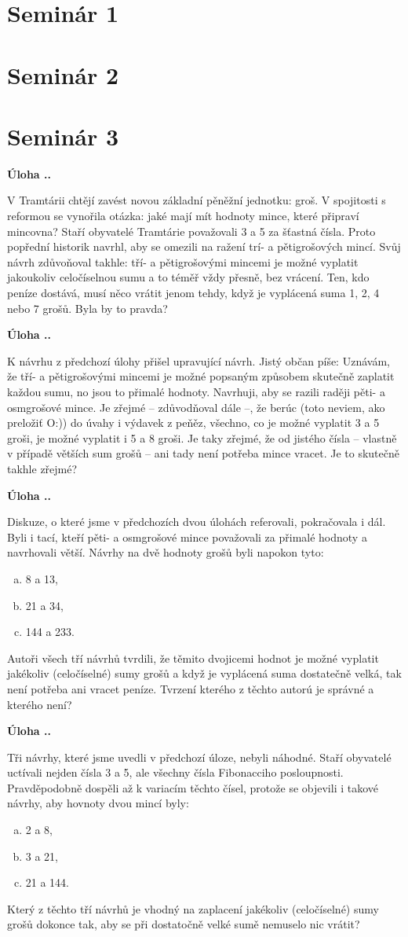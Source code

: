 \documentclass{article}
\newcounter{seminar}
\newcounter{problem}
\newcommand{\seminar}[1]{
  \clearpage
  \setcounter{seminar}{#1}
  \setcounter{problem}{0}
  \section*{Seminár #1}
}
\newcommand{\source}[1]{
  \def\temp{#1}\ifx\temp\empty
  \else
    [#1]
  \fi
}
\newcommand{\problem}[3]{
  \stepcounter{problem}
  \noindent\textbf{Úloha \theseminar .\theproblem.}
    \source{#1} #2
  \bigskip
}
\begin{document}
\seminar{1}

\seminar{2}

\seminar{3}

\problem{}{
V Tramtárii chtějí zavést novou základní pěněžní jednotku: groš. V spojitosti s reformou se vynořila otázka: jaké mají mít hodnoty mince, které připraví mincovna? Staří obyvatelé Tramtárie považovali 3 a 5 za šťastná čísla. Proto popřední historik navrhl, aby se omezili na ražení trí- a pětigrošových mincí. Svůj návrh zdůvoňoval takhle: tří- a pětigrošovými mincemi je možné vyplatit jakoukoliv celočíselnou sumu a to téměř vždy přesně, bez vrácení. Ten, kdo peníze dostává, musí něco vrátit jenom tehdy, když je vyplácená suma 1, 2, 4 nebo 7 grošů. Byla by to pravda?
}{
}

\problem{}{
K návrhu z předchozí úlohy přišel upravující návrh. Jistý občan píše: Uznávám, že tří- a pětigrošovými mincemi je možné popsaným způsobem skutečně zaplatit každou sumu, no jsou to přimalé hodnoty. Navrhuji, aby se razili raději pěti- a osmgrošové mince. Je zřejmé -- zdůvodňoval dále --, že berúc (toto neviem, ako preložiť O:)) do úvahy i výdavek z peňěz, všechno, co je možné vyplatit 3 a 5 groši, je možné vyplatit i 5 a 8 groši. Je taky zřejmé, že od jistého čísla -- vlastně v případě větších sum grošů -- ani tady není potřeba mince vracet. Je to skutečně takhle zřejmé?
}{
}

\problem{}{
Diskuze, o které jsme v předchozích dvou úlohách referovali, pokračovala i dál. Byli i tací, kteří pěti- a osmgrošové mince považovali za přimalé hodnoty a navrhovali větší. Návrhy na dvě hodnoty grošů byli napokon tyto:
\begin{enumerate}[a)]
\item 8 a 13,
\item 21 a 34,
\item 144 a 233.
\end{enumerate}
Autoři všech tří návrhů tvrdili, že těmito dvojicemi hodnot je možné vyplatit jakékoliv (celočíselné) sumy grošů a když je vyplácená suma dostatečně velká, tak není potřeba ani vracet peníze. Tvrzení kterého z těchto autorú je správné a kterého není?
}{
}

\problem{}{
Tři návrhy, které jsme uvedli v předchozí úloze, nebyli náhodné. Staří obyvatelé uctívali nejden čísla 3 a 5, ale všechny čísla Fibonacciho posloupnosti. Pravděpodobně dospěli až k variacím těchto čísel, protože se objevili i takové návrhy, aby hovnoty dvou mincí byly:
\begin{enumerate}[a)]
\item 2 a 8,
\item 3 a 21,
\item 21 a 144.
\end{enumerate}
Který z těchto tří návrhů je vhodný na zaplacení jakékoliv (celočíselné) sumy grošů dokonce tak, aby se při dostatočně velké sumě nemuselo nic vrátit?
}{
}
\end{document}
